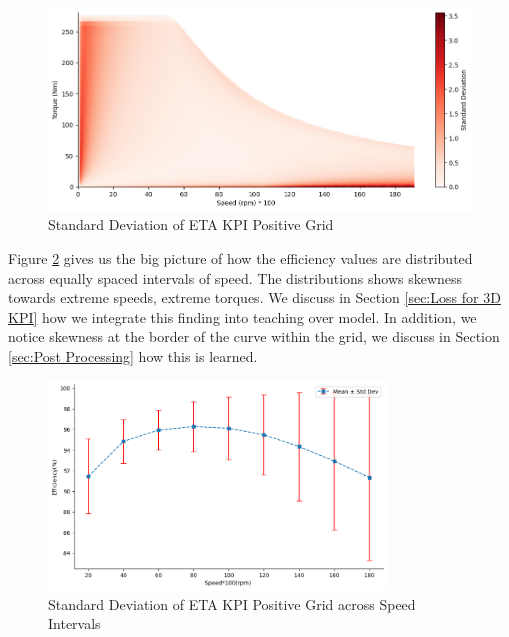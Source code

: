 \documentclass{report} %
\begin{document}
\begin{figure}[H]
    \centering
    \includegraphics[width=1\textwidth]{./ReportImages/pos_stddev_y2.png} 
    \caption{Standard Deviation of ETA \ac{KPI} Positive Grid} 
    \label{fig:Standard Deviation of 3D KPI(ETA) Positive Grid}
\end{figure}

Figure \ref{fig:Standard Deviation of 3D KPI(ETA) Positive Grid across Speed Intervals} gives us the big picture of how the efficiency values are distributed across equally spaced intervals of speed.
The distributions shows skewness towards extreme speeds, extreme torques. We discuss in Section \ref{sec:Loss for 3D KPI} how we integrate this finding into teaching over model.
In addition, we notice skewness at the border of the curve within the grid, we discuss in Section \ref{sec:Post Processing} how this is learned.
\begin{figure}[H]
    \centering
    \includegraphics[width=0.8\textwidth]{./ReportImages/stddev_y2_nn_Target.png} 
    \caption{Standard Deviation of ETA \ac{KPI} Positive Grid across Speed Intervals} 
    \label{fig:Standard Deviation of 3D KPI(ETA) Positive Grid across Speed Intervals}
\end{figure}
\end{document}
